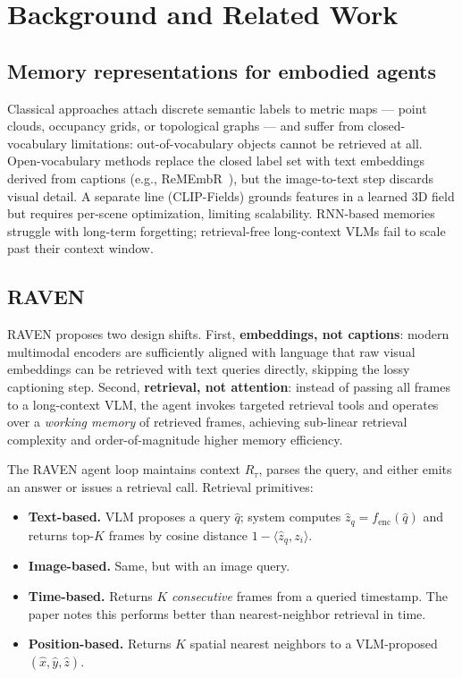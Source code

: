 \documentclass[11pt]{article}
\begin{document}
\section{Background and Related Work}

\subsection{Memory representations for embodied agents}
Classical approaches attach discrete semantic labels to metric maps --- point clouds, occupancy grids, or topological graphs --- and suffer from closed-vocabulary limitations: out-of-vocabulary objects cannot be retrieved at all. Open-vocabulary methods replace the closed label set with text embeddings derived from captions (e.g., ReMEmbR~\cite{anwar2024remembr}), but the image-to-text step discards visual detail. A separate line (CLIP-Fields) grounds features in a learned 3D field but requires per-scene optimization, limiting scalability. RNN-based memories struggle with long-term forgetting; retrieval-free long-context VLMs fail to scale past their context window.

\subsection{RAVEN}
RAVEN proposes two design shifts. First, \textbf{embeddings, not captions}: modern multimodal encoders are sufficiently aligned with language that raw visual embeddings can be retrieved with text queries directly, skipping the lossy captioning step. Second, \textbf{retrieval, not attention}: instead of passing all frames to a long-context VLM, the agent invokes targeted retrieval tools and operates over a \emph{working memory} of retrieved frames, achieving sub-linear retrieval complexity and order-of-magnitude higher memory efficiency.

The RAVEN agent loop maintains context $R_\tau$, parses the query, and either emits an answer or issues a retrieval call. Retrieval primitives:
\begin{itemize}[leftmargin=*,itemsep=2pt]
  \item \textbf{Text-based.} VLM proposes a query $\hat{q}$; system computes $\hat{z}_q = f_{\text{enc}}(\hat{q})$ and returns top-$K$ frames by cosine distance $1 - \langle \hat{z}_q, z_i \rangle$.
  \item \textbf{Image-based.} Same, but with an image query.
  \item \textbf{Time-based.} Returns $K$ \emph{consecutive} frames from a queried timestamp. The paper notes this performs better than nearest-neighbor retrieval in time.
  \item \textbf{Position-based.} Returns $K$ spatial nearest neighbors to a VLM-proposed $(\hat{x}, \hat{y}, \hat{z})$.
\end{itemize}
\end{document}
